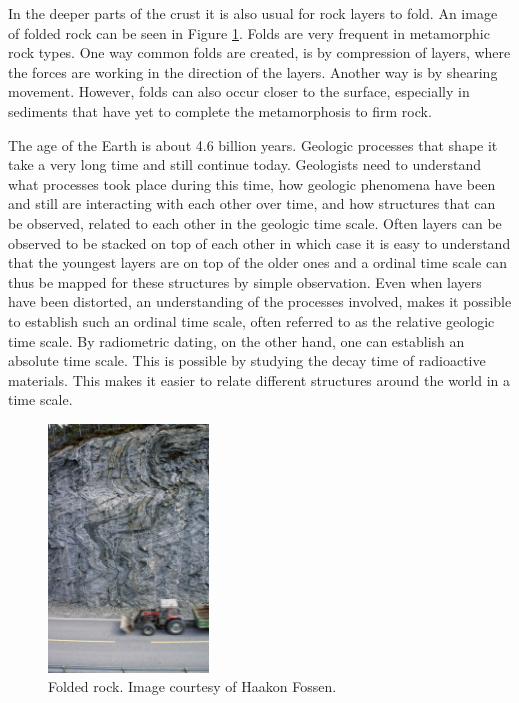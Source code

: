\documentclass[a4paper,12pt]{report}
\begin{document}
In the deeper parts of the crust it is also usual for rock layers to fold. An image of folded rock can be seen in Figure \ref{fig:fold}. Folds are very frequent in metamorphic rock types. One way common folds are created, is by compression of layers, where the forces are working in the direction of the layers. Another way is by shearing movement. However, folds can also occur closer to the surface, especially in sediments that have yet to complete the metamorphosis to firm rock.



The age of the Earth is about 4.6 billion years. Geologic processes that shape it take a very long time and still continue today. Geologists need to understand what processes took place during this time, how geologic phenomena have been and still are interacting with each other over time, and how structures that can be observed, related to each other in the geologic time scale. Often layers can be observed to be stacked on top of each other in which case it is easy to understand that the youngest layers are on top of the older ones and a ordinal time scale can thus be mapped for these structures by simple observation. Even when layers have been distorted, an understanding of the processes involved, makes it possible to establish such an ordinal time scale, often referred to as the relative geologic time scale. By radiometric dating, on the other hand, one can establish an absolute time scale. This is possible by studying the decay time of radioactive materials. This makes it easier to relate different structures around the world in a time scale.
\begin{figure}
  \begin{center}
    \includegraphics[width=0.38\textwidth]{thesis/geo/fold.png}
  \end{center}
  \caption{Folded rock. Image courtesy of Haakon Fossen.}
  \label{fig:fold}
  
\end{figure}
\end{document}
